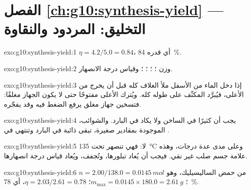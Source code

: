 \section*{الفصل \ref{ch:g10:synthesis-yield} --- التخليق: المردود والنقاوة}

\begin{solution}{exo:g10:synthesis-yield:1}
$\eta = 4.2 / 5.0 = 0.84$، أي  قدره \qty{84}{\percent}.
\end{solution}

\begin{solution}{exo:g10:synthesis-yield:2}
وزن ؛ ؛  ؛ ؛ وقياس درجة الانصهار.
\end{solution}

\begin{solution}{exo:g10:synthesis-yield:3}
إذا دخل الماء من الأسفل ملأ الغلاف كله قبل أن يخرج من الأعلى، فيُبرَّد المكثّف
على طوله كله. ويُترك الأعلى مفتوحًا حتى لا يكون الجهاز مغلقًا: فتسخين جهاز
مغلق يرفع الضغط فيه وقد يفجّره.
\end{solution}

\begin{solution}{exo:g10:synthesis-yield:4}
يجب أن   كثيرًا في  الساخن ولا يكاد  في  البارد.
والشوائب، الموجودة بمقادير صغيرة، تبقى ذائبة في  البارد وتنتهي في
.
\end{solution}

\begin{solution}{exo:g10:synthesis-yield:5}
لا: فهي تنصهر تحت \qty{135}{\celsius} وعلى مدى عدة درجات، وهذه علامة جسم صلب
غير نقي. فيجب أن يُعاد تبلورها، وتُجفف، ويُعاد قياس درجة
انصهارها.
\end{solution}

\begin{solution}{exo:g10:synthesis-yield:6}
$n = 2.00 / 138.0 = \qty{0.0145}{mol}$ من حمض الساليسيليك، وهو ؛ $m_{\max} = 0.0145 \times 180.0 = \qty{2.61}{g}$؛
$\eta = 2.03 / 2.61 = 0.78$، أي \qty{78}{\percent}.
\end{solution}

